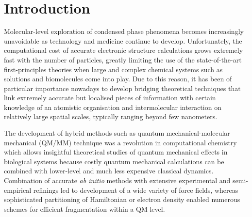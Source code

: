\documentclass[aip,amsmath,amssymb,reprint,floatfix]{revtex4-1}
\begin{document}
\section{\label{s:1}Introduction}

Molecular\hyp{}level exploration of condensed phase phenomena becomes increasingly unavoidable
as technology and medicine continue to develop. Unfortunately, the computational cost of accurate
electronic structure calculations grows extremely fast with the number of particles, greatly limiting
the use of the state\hyp{}of\hyp{}the\hyp{}art first\hyp{}principles theories when large and complex 
chemical systems such as solutions and biomolecules come into play.\cite{
Xu.Guidez.Bertoni.Gordon.JCP.2018,Tomasi.Mennucci.Cammi.ChemRev.2005}
Due to this reason, it has been of particular importance nowadays to develop bridging theoretical techniques 
that link extremely accurate but localised pieces of information with certain knowledge of an atomistic 
organisation and intermolecular interaction on relatively large spatial scales, typically ranging beyond 
few nanometers. 

The development of hybrid methods such as quantum mechanical\hyp{}molecular mechanical (QM/MM) technique 
was a revolution in computational chemistry which allows insightful theoretical studies of quantum mechanical
effects in biological systems because costly quantum mechanical calculations can be combined with lower\hyp{}level 
and much less expensive classical dynamics.\cite{Warshel.Levitt.JMolBiol.1976,Senn.Thiel.Angew.2009}
Combination of accurate \emph{ab initio} methods with extensive experimental and semi\hyp{}empirical
refinings led to development of a wide variety of force fields,\cite{Demerdash.Yap.T-Head-Gordon.AnnuRevPhysChem.2014}
whereas sophisticated partitioning of Hamiltonian or electron density enabled numerous schemes for efficient fragmentation
within a QM level.\cite{Gordon.Fedorov.Pruitt.Slipchenko.ChemRev.2012}
\end{document}
